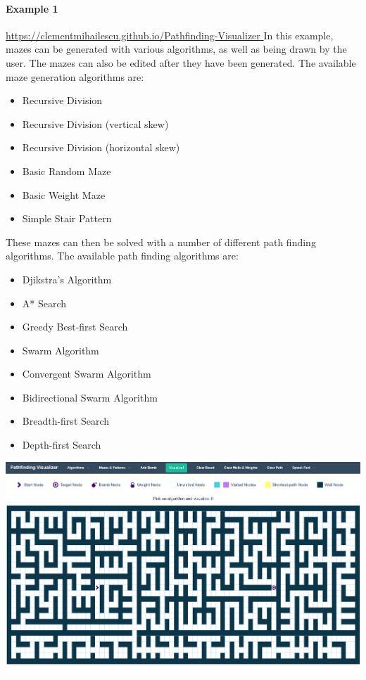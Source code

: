\documentclass[titlepage]{article}
\begin{document}
\paragraph{Example 1}
\href{https://clementmihailescu.github.io/Pathfinding-Visualizer/
}{https://clementmihailescu.github.io/Pathfinding-Visualizer
}
\newline
In this example, mazes can be generated with various algorithms, as well as being drawn by the user. The mazes can also be edited after they have been generated. The available maze generation algorithms are:
\begin{itemize}
    \item Recursive Division
    \item Recursive Division (vertical skew)
    \item Recursive Division (horizontal skew)
    \item Basic Random Maze
    \item Basic Weight Maze
    \item Simple Stair Pattern
\end{itemize}
These mazes can then be solved with a number of different path finding algorithms. The available path finding algorithms are:
\begin{itemize}
    \item Djikstra's Algorithm
    \item A* Search
    \item Greedy Best-first Search
    \item Swarm Algorithm
    \item Convergent Swarm Algorithm
    \item Bidirectional Swarm Algorithm
    \item Breadth-first Search
    \item Depth-first Search
\end{itemize}
\includegraphics[width=\linewidth]{assets/Existing Solutions/example 1.PNG}
\end{document}
